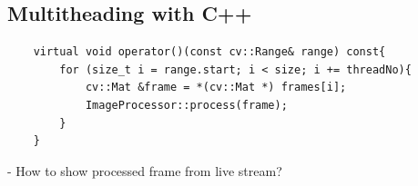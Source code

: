         \subsection{Multitheading with C++}

\begin{lstlisting}
    virtual void operator()(const cv::Range& range) const{
        for (size_t i = range.start; i < size; i += threadNo){
            cv::Mat &frame = *(cv::Mat *) frames[i];
            ImageProcessor::process(frame);
        }
    }
\end{lstlisting}

        - How to show processed frame from live stream?
